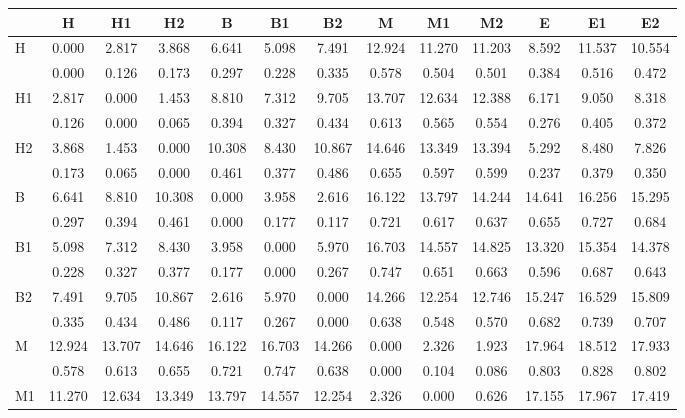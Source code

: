 \begin{table*}[h!]
\begin{center}
\begin{tabular}{| l | c | c | c | c | c | c | c | c | c | c | c | c |}\hline
 & H & H1 & H2 & B & B1 & B2 & M & M1 & M2 & E & E1 & E2 \\\hline
H & 0.000  & 2.817  & 3.868  & 6.641  & 5.098  & 7.491  & 12.924  & 11.270  & 11.203  & 8.592  & 11.537  & 10.554 \\\hline
 & 0.000  & 0.126  & 0.173  & 0.297  & 0.228  & 0.335  & 0.578  & 0.504  & 0.501  & 0.384  & 0.516  & 0.472 \\\hline
H1 & 2.817  & 0.000  & 1.453  & 8.810  & 7.312  & 9.705  & 13.707  & 12.634  & 12.388  & 6.171  & 9.050  & 8.318 \\\hline
 & 0.126  & 0.000  & 0.065  & 0.394  & 0.327  & 0.434  & 0.613  & 0.565  & 0.554  & 0.276  & 0.405  & 0.372 \\\hline
H2 & 3.868  & 1.453  & 0.000  & 10.308  & 8.430  & 10.867  & 14.646  & 13.349  & 13.394  & 5.292  & 8.480  & 7.826 \\\hline
 & 0.173  & 0.065  & 0.000  & 0.461  & 0.377  & 0.486  & 0.655  & 0.597  & 0.599  & 0.237  & 0.379  & 0.350 \\\hline
B & 6.641  & 8.810  & 10.308  & 0.000  & 3.958  & 2.616  & 16.122  & 13.797  & 14.244  & 14.641  & 16.256  & 15.295 \\\hline
 & 0.297  & 0.394  & 0.461  & 0.000  & 0.177  & 0.117  & 0.721  & 0.617  & 0.637  & 0.655  & 0.727  & 0.684 \\\hline
B1 & 5.098  & 7.312  & 8.430  & 3.958  & 0.000  & 5.970  & 16.703  & 14.557  & 14.825  & 13.320  & 15.354  & 14.378 \\\hline
 & 0.228  & 0.327  & 0.377  & 0.177  & 0.000  & 0.267  & 0.747  & 0.651  & 0.663  & 0.596  & 0.687  & 0.643 \\\hline
B2 & 7.491  & 9.705  & 10.867  & 2.616  & 5.970  & 0.000  & 14.266  & 12.254  & 12.746  & 15.247  & 16.529  & 15.809 \\\hline
 & 0.335  & 0.434  & 0.486  & 0.117  & 0.267  & 0.000  & 0.638  & 0.548  & 0.570  & 0.682  & 0.739  & 0.707 \\\hline
M & 12.924  & 13.707  & 14.646  & 16.122  & 16.703  & 14.266  & 0.000  & 2.326  & 1.923  & 17.964  & 18.512  & 17.933 \\\hline
 & 0.578  & 0.613  & 0.655  & 0.721  & 0.747  & 0.638  & 0.000  & 0.104  & 0.086  & 0.803  & 0.828  & 0.802 \\\hline
M1 & 11.270  & 12.634  & 13.349  & 13.797  & 14.557  & 12.254  & 2.326  & 0.000  & 0.626  & 17.155  & 17.967  & 17.419 \\\hline

\end{tabular}
\end{center}
\end{table*}
